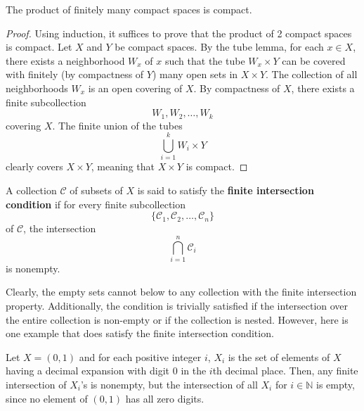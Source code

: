   \begin{theorem}
    The product of finitely many compact spaces is compact. 
  \end{theorem}
  \begin{proof}
    Using induction, it suffices to prove that the product of 2 compact spaces is compact. Let $X$ and $Y$ be compact spaces. By the tube lemma, for each $x \in X$, there exists a neighborhood $W_x$ of $x$ such that the tube $W_x \times Y$ can be covered with finitely (by compactness of $Y$) many open sets in $X \times Y$. The collection of all neighborhoods $W_x$ is an open covering of $X$. By compactness of $X$, there exists a finite subcollection
    \begin{equation}
      W_1, W_2, \ldots , W_k
    \end{equation}
    covering $X$. The finite union of the tubes 
    \begin{equation}
      \bigcup_{i=1}^k W_i \times Y
    \end{equation}
    clearly covers $X \times Y$, meaning that $X \times Y$ is compact. 
  \end{proof}

  \begin{definition}
    A collection $\mathcal{C}$ of subsets of $X$ is said to satisfy the \textbf{finite intersection condition} if for every finite subcollection 
    \begin{equation}
      \{\mathcal{C}_1, \mathcal{C}_2, \ldots , \mathcal{C}_n\}
    \end{equation}
    of $\mathcal{C}$, the intersection
    \begin{equation}
      \bigcap_{i=1}^n \mathcal{C}_i
    \end{equation}
    is nonempty. 
  \end{definition}

  Clearly, the empty sets cannot below to any collection with the finite intersection property. Additionally, the condition is trivially satisfied if the intersection over the entire collection is non-empty or if the collection is nested. However, here is one example that does satisfy the finite intersection condition. 

  \begin{example}
    Let $X = (0,1)$ and for each positive integer $i$, $X_i$ is the set of elements of $X$ having a decimal expansion with digit $0$ in the $i$th decimal place. Then, any finite intersection of $X_i$'s is nonempty, but the intersection of all $X_i$ for $i \in \mathbb{N}$ is empty, since no element of $(0,1)$ has all zero digits. 
  \end{example}

